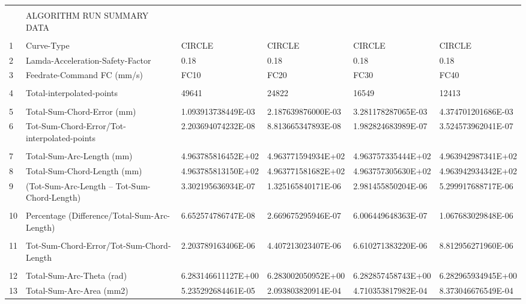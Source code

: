 \begin{landscape}
\begin{table}[ht]
{\begin{tabular}{ p{0.4cm} p{8.3cm} p{4.00cm} p{4.0cm} p{4.00cm} p{4.0cm}}
&		&		&		&		&		\\
	&	ALGORITHM RUN SUMMARY DATA	                    &		&		&		&		\\
&		&		&		&		&		\\
1	&	Curve-Type	                                    &	CIRCLE	&	CIRCLE	&	CIRCLE	&	CIRCLE	\\
2	&	Lamda-Acceleration-Safety-Factor	            &	0.18	&	0.18	&	0.18	&	0.18	\\
3	&	Feedrate-Command FC (mm/s)	                    &	FC10	&	FC20	&	FC30	&	FC40	\\
&		&		&		&		&		\\
4	&	Total-interpolated-points	                    &	49641	&	24822	&	16549	&	12413	\\
&		&		&		&		&		\\
5	&	Total-Sum-Chord-Error (mm) 	                    &	1.093913738449E-03	&	2.187639876000E-03	&	3.281178287065E-03	&	4.374701201686E-03	\\
6	&	Tot-Sum-Chord-Error/Tot-interpolated-points	    &	2.203694074232E-08	&	8.813665347893E-08	&	1.982824683989E-07	&	3.524573962041E-07	\\
&		&		&		&		&		\\
7	&	Total-Sum-Arc-Length (mm)	                    &	4.963785816452E+02	&	4.963771594934E+02	&	4.963757335444E+02	&	4.963942987341E+02	\\
8	&	Total-Sum-Chord-Length (mm)	                    &	4.963785813150E+02	&	4.963771581682E+02	&	4.963757305630E+02	&	4.963942934342E+02	\\
9	&	(Tot-Sum-Arc-Length – Tot-Sum-Chord-Length)	    &	3.302195636934E-07	&	1.325165840171E-06	&	2.981455850204E-06	&	5.299917688717E-06	\\
&		&		&		&		&		\\
10	&	Percentage (Difference/Total-Sum-Arc-Length)	&	6.652574786747E-08	&	2.669675295946E-07	&	6.006449648363E-07	&	1.067683029848E-06	\\
&		&		&		&		&		\\
11	&	Tot-Sum-Chord-Error/Tot-Sum-Chord-Length 	    &	2.203789163406E-06	&	4.407213023407E-06	&	6.610271383220E-06	&	8.812956271960E-06	\\
&		&		&		&		&		\\
12	&	Total-Sum-Arc-Theta (rad)	                    &	6.283146611127E+00	&	6.283002050952E+00	&	6.282857458743E+00	&	6.282965934945E+00	\\
13	&	Total-Sum-Arc-Area (mm2)	                    &	5.235292684461E-05	&	2.093803820914E-04	&	4.710353817982E-04	&	8.373046676549E-04	\\

\end{tabular}}
\end{table}
\end{landscape}
